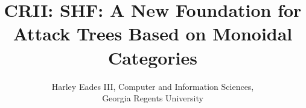 \usepackage{amsmath,amssymb,amsthm}

\usepackage{fullpage}
\usepackage{hyperref}
\usepackage{color}
\usepackage[barr]{xy}
\usepackage{todonotes}
\usepackage{tikz}
\usepackage{tikz-qtree}
\usepackage{stmaryrd}
\usepackage{mathpartir}
\usepackage{layout}
\usepackage[margin=1.1in]{geometry}


\newtheorem{thm}{Theorem}
\newtheorem{lemma}[thm]{Lemma}
\newtheorem{corollary}[thm]{Corollary}
\newtheorem{definition}[thm]{Definition}
\newtheorem{remark}[thm]{Remark}
\newtheorem{proposition}[thm]{Proposition}
\newtheorem{notn}[thm]{Notation}
\newtheorem{observation}[thm]{Observation}

\newcommand{\cat}[1]{\mathbb{#1}}
\newcommand{\catobj}[1]{\mathsf{Obj}(\cat{#1})}
\newcommand{\catop}[1]{\mathbb{#1}^{\mathsf{op}}}
\newcommand{\sets}[0]{\mathsf{Sets}}
\newcommand{\homs}[2]{\mathsf{Hom}[#1,#2]}
\newcommand{\cur}[0]{\mathsf{cur}}
\newcommand{\curi}[0]{\mathsf{cur}^{-1}}
\newcommand{\app}[0]{\mathsf{app}}
\newcommand{\id}[0]{\mathsf{id}}
\newcommand{\injl}[0]{\mathsf{inj_l}}
\newcommand{\injr}[0]{\mathsf{inj_r}}
\newcommand{\pow}[1]{\mathcal{P}(#1)}
\newcommand{\cpy}[0]{\textcopyright}
\newcommand{\lett}[3]{\mathsf{let}\,#1 = #2\,\mathsf{in}\,#3}



\title{\vspace{-50px}CRII: SHF: A New Foundation for Attack Trees Based on Monoidal Categories}
\author{Harley Eades III, Computer and Information Sciences, \\Georgia Regents University}
\date{\vspace{-22px}}

\maketitle  


